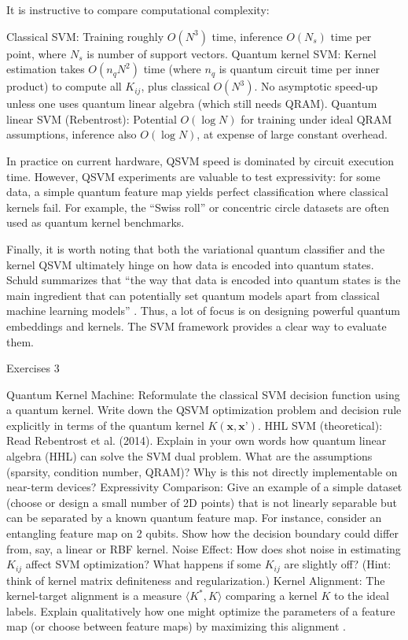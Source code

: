 It is instructive to compare computational complexity:



Classical SVM: Training roughly $O(N^3)$ time, inference $O(N_s)$ time per point, where $N_s$ is number of support vectors.
Quantum kernel SVM: Kernel estimation takes $O(n_q N^2)$ time (where $n_q$ is quantum circuit time per inner product) to compute all $K_{ij}$, plus classical $O(N^3)$.  No asymptotic speed-up unless one uses quantum linear algebra (which still needs QRAM).
Quantum linear SVM (Rebentrost): Potential $O(\log N)$ for training under ideal QRAM assumptions, inference also $O(\log N)$, at expense of large constant overhead.




In practice on current hardware, QSVM speed is dominated by circuit execution time.  However, QSVM experiments are valuable to test expressivity: for some data, a simple quantum feature map yields perfect classification where classical kernels fail.  For example, the “Swiss roll” or concentric circle datasets are often used as quantum kernel benchmarks.



Finally, it is worth noting that both the variational quantum classifier and the kernel QSVM ultimately hinge on how data is encoded into quantum states.  Schuld summarizes that “the way that data is encoded into quantum states is the main ingredient that can potentially set quantum models apart from classical machine learning models” .  Thus, a lot of focus is on designing powerful quantum embeddings and kernels.  The SVM framework provides a clear way to evaluate them.





Exercises 3





Quantum Kernel Machine: Reformulate the classical SVM decision function using a quantum kernel.  Write down the QSVM optimization problem and decision rule explicitly in terms of the quantum kernel $K(\mathbf{x},\mathbf{x}’)$.
HHL SVM (theoretical): Read Rebentrost et al. (2014).  Explain in your own words how quantum linear algebra (HHL) can solve the SVM dual problem.  What are the assumptions (sparsity, condition number, QRAM)?  Why is this not directly implementable on near-term devices?
Expressivity Comparison: Give an example of a simple dataset (choose or design a small number of 2D points) that is not linearly separable but can be separated by a known quantum feature map.  For instance, consider an entangling feature map on 2 qubits.  Show how the decision boundary could differ from, say, a linear or RBF kernel.
Noise Effect: How does shot noise in estimating $K_{ij}$ affect SVM optimization?  What happens if some $K_{ij}$ are slightly off?  (Hint: think of kernel matrix definiteness and regularization.)
Kernel Alignment: The kernel-target alignment is a measure $\langle K^*,K\rangle$ comparing a kernel $K$ to the ideal labels.  Explain qualitatively how one might optimize the parameters of a feature map (or choose between feature maps) by maximizing this alignment .






